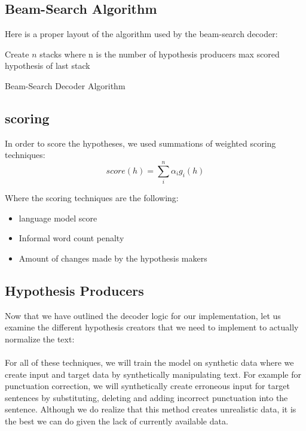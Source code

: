 \documentclass{article}
\begin{document}
\subsection{Beam-Search Algorithm}
Here is a proper layout of the algorithm used by the beam-search decoder:\\
\begin{algorithm}[H]
Create $n$ stacks where n is the number of hypothesis producers\;
\Return max scored hypothesis of last stack
\caption{Beam-Search Decoder Algorithm}
\end{algorithm}

\subsection{scoring}

In order to score the hypotheses, we used summations of weighted scoring techniques: 
$$score(h) = \sum_{i}^{n}{\alpha_ig_i(h)}$$

Where the scoring techniques are the following:
\begin{itemize}
	\item language model score 
	\item Informal word count penalty
	\item Amount of changes made by the hypothesis makers
\end{itemize}

\subsection{Hypothesis Producers}

Now that we have outlined the decoder logic for our implementation, let us examine the different hypothesis creators that we need to implement to actually normalize the text: \\\\
For all of these techniques, we will train the model on synthetic data where we create input and target data by synthetically manipulating text. For example for punctuation correction, we will synthetically create erroneous input for target sentences by substituting, deleting and adding incorrect punctuation into the sentence. Although we do realize that this method creates unrealistic data, it is the best we can do given the lack of currently available data.\\\\\\
\end{document}
